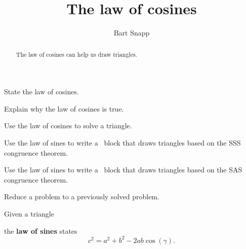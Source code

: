 \documentclass[noauthor,nooutcomes,12pt]{ximera}
\title{The law of cosines}
\author{Bart Snapp}
\begin{document}
\begin{abstract}
   The law of cosines can help us draw triangles.
\end{abstract}
\maketitle

\begin{listOutcomes}
\item State the law of cosines.
\item Explain why the law of cosines is true.
\item Use the law of cosines to solve a triangle.
\item Use the law of sines to write a \snap\ block that draws triangles
  based on the SSS congruence theorem.
\item Use the law of sines to write a \snap\ block that draws triangles
  based on the SAS congruence theorem.
\item Reduce a problem to a previously solved problem.
\end{listOutcomes}
\mynewpage

Given a triangle
\begin{center}
\end{center}
the \textbf{law of sines} states
\[
c^2 = a^2 + b^2 - 2ab\cos(\gamma).
\]
  
\end{document}
